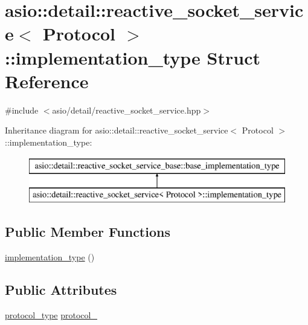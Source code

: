 \hypertarget{structasio_1_1detail_1_1reactive__socket__service_1_1implementation__type}{}\section{asio\+:\+:detail\+:\+:reactive\+\_\+socket\+\_\+service$<$ Protocol $>$\+:\+:implementation\+\_\+type Struct Reference}
\label{structasio_1_1detail_1_1reactive__socket__service_1_1implementation__type}


{\ttfamily \#include $<$asio/detail/reactive\+\_\+socket\+\_\+service.\+hpp$>$}

Inheritance diagram for asio\+:\+:detail\+:\+:reactive\+\_\+socket\+\_\+service$<$ Protocol $>$\+:\+:implementation\+\_\+type\+:\begin{figure}[H]
\begin{center}
\leavevmode
\includegraphics[height=2.000000cm]{structasio_1_1detail_1_1reactive__socket__service_1_1implementation__type}
\end{center}
\end{figure}
\subsection*{Public Member Functions}
\begin{DoxyCompactItemize}
\item 
\hyperlink{structasio_1_1detail_1_1reactive__socket__service_1_1implementation__type_a922a05a7a2ef3332d822a3484ebbb23b}{implementation\+\_\+type} ()
\end{DoxyCompactItemize}
\subsection*{Public Attributes}
\begin{DoxyCompactItemize}
\item 
\hyperlink{classasio_1_1detail_1_1reactive__socket__service_a622bd8618dbd40771a5b6a66eb1b75e9}{protocol\+\_\+type} \hyperlink{structasio_1_1detail_1_1reactive__socket__service_1_1implementation__type_a2758dd8a5ce0dee6fb61e2df2d50253d}{protocol\+\_\+}
\end{DoxyCompactItemize}


